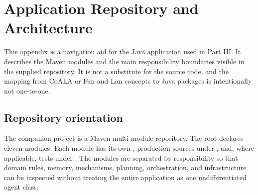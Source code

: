\chapter{Application Repository and Architecture}
\label{app:architecture}

This appendix is a navigation aid for the Java application used in Part III. It describes the Maven modules and the main responsibility boundaries visible in the supplied repository. It is not a substitute for the source code, and the mapping from CoALA or Fan and Lan concepts to Java packages is intentionally not one-to-one.

\section{Repository orientation}

The companion project is a Maven multi-module repository. The root  declares eleven modules. Each module has its own , production sources under , and, where applicable, tests under . The modules are separated by responsibility so that domain rules, memory, mechanisms, planning, orchestration, and infrastructure can be inspected without treating the entire application as one undifferentiated agent class.

